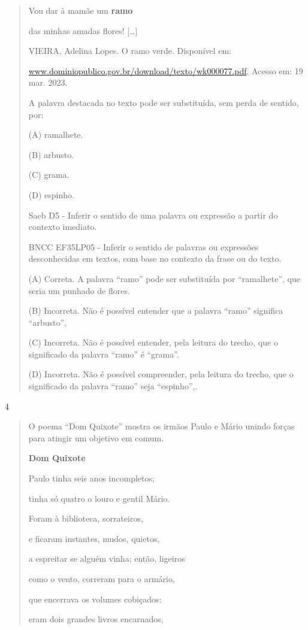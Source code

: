 \begin{itemize}
{{{\begin{itemize}
\begin{itemize}
\begin{itemize}
\begin{quote}
Vou dar à mamãe um \textbf{ramo}

das minhas amadas flores! {[}\ldots{}{]}

VIEIRA, Adelina Lopes. O ramo verde. Disponível em:

\href{http://www.dominiopublico.gov.br/download/texto/wk000077.pdf}{www.dominiopublico.gov.br/download/texto/wk000077.pdf}.
Acesso em: 19 mar. 2023.

A palavra destacada no texto pode ser substituída, sem perda de sentido,
por:

(A) ramalhete.

(B) arbusto.

(C) grama.

(D) espinho.

Saeb D5 - Inferir o sentido de uma palavra ou expressão a partir do
contexto imediato.

BNCC EF35LP05 - Inferir o sentido de palavras ou expressões
desconhecidas em textos, com base no contexto da frase ou do texto.

(A) Correta. A palavra ``ramo'' pode ser substituída por ``ramalhete'',
que seria um punhado de flores.

(B) Incorreta. Não é possível entender que a palavra ``ramo'' significa
``arbusto'',

(C) Incorreta. Não é possível entender, pela leitura do trecho, que o
significado da palavra ``ramo'' é ``grama''.

(D) Incorreta. Não é possível compreender, pela leitura do trecho, que o
significado da palavra ``ramo'' seja ``espinho'',.
\end{quote}

\num{4}

\begin{quote}
O poema ``Dom Quixote'' mostra os irmãos Paulo e Mário unindo forças
para atingir um objetivo em comum.

\textbf{Dom Quixote}

Paulo tinha seis anos incompletos;

tinha só quatro o louro e gentil Mário.

Foram à biblioteca, sorrateiros,

e ficaram instantes, mudos, quietos,

a espreitar se alguém vinha; então, ligeiros

como o vento, correram para o armário,

que encerrava os volumes cobiçados:

eram dois grandes livros encarnados,


\end{quote}
\end{itemize}
\end{itemize}
\end{itemize}}}}
\end{itemize}
